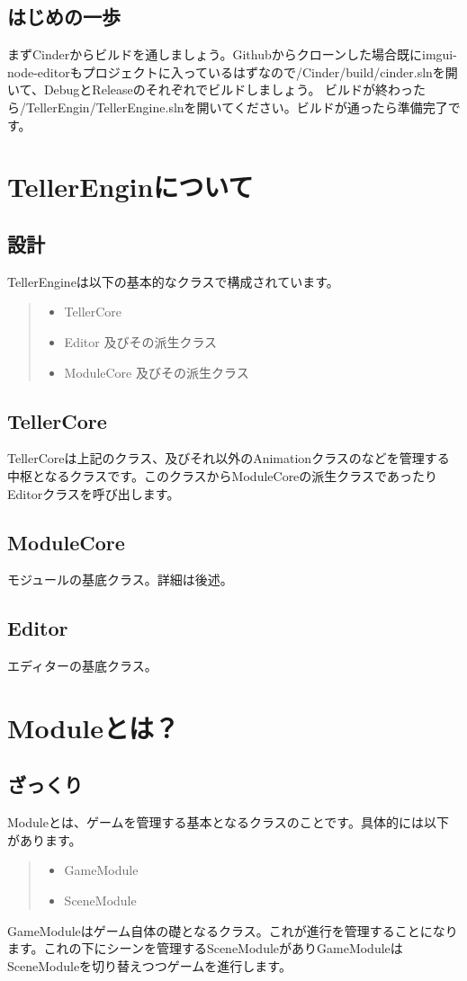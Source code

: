 \documentclass[12pt,a4paper,uplatex,dvipdfmx]{jsarticle}
\begin{document}
\subsection{はじめの一歩}
まずCinderからビルドを通しましょう。Githubからクローンした場合既にimgui-node-editorもプロジェクトに入っているはずなので/Cinder/build/cinder.slnを開いて、DebugとReleaseのそれぞれでビルドしましょう。
ビルドが終わったら/TellerEngin/TellerEngine.slnを開いてください。ビルドが通ったら準備完了です。
\section{TellerEnginについて}
\subsection{設計}
TellerEngineは以下の基本的なクラスで構成されています。
\begin{quote}
  \begin{itemize}
    \item TellerCore
    \item Editor 及びその派生クラス
    \item ModuleCore 及びその派生クラス
  \end{itemize}
\end{quote}
\subsection{TellerCore}
TellerCoreは上記のクラス、及びそれ以外のAnimationクラスのなどを管理する中枢となるクラスです。このクラスからModuleCoreの派生クラスであったりEditorクラスを呼び出します。
\subsection{ModuleCore}
モジュールの基底クラス。詳細は後述。
\subsection{Editor}
エディターの基底クラス。
\section{Moduleとは？}
\subsection{ざっくり}
Moduleとは、ゲームを管理する基本となるクラスのことです。具体的には以下があります。
\begin{quote}
  \begin{itemize}
    \item GameModule
    \item SceneModule
  \end{itemize}
\end{quote}
GameModuleはゲーム自体の礎となるクラス。これが進行を管理することになります。これの下にシーンを管理するSceneModuleがありGameModuleはSceneModuleを切り替えつつゲームを進行します。
\end{document}
